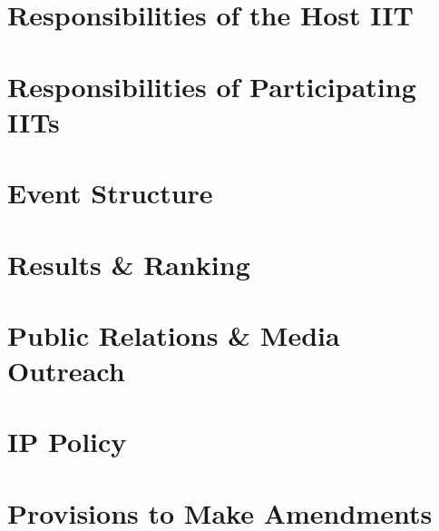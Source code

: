 \documentclass[letterpaper,12pt,titlepage]{article}
\begin{document}
\newpage
\section{Responsibilities of the Host IIT}


\newpage
\section{Responsibilities of Participating IITs}


\newpage
\section{Event Structure}


\newpage
\section{Results \& Ranking}


\newpage
\section{Public Relations \& Media Outreach}


\newpage
\section{IP Policy}


\newpage
\section{Provisions to Make Amendments}

\end{document}
